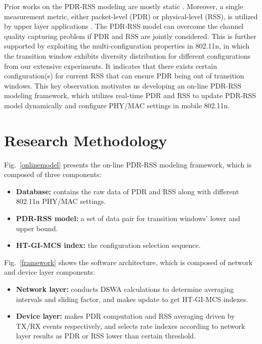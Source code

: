 \documentclass[draftclsnofoot,journal,onecolumn,11pt]{IEEEtran}
\begin{document}
Prior works on the PDR-RSS modeling are mostly static \cite{kashyap2007capacity} \cite{kolar2011mesh} \cite{reis2006model}. Moreover, a single measurement metric, either packet-level (PDR) or physical-level (RSS), is utilized by upper layer applications\cite{judd2008efficient} \cite{zhang2008practical}. The PDR-RSS model can overcome the channel quality capturing problem if PDR and RSS are jointly considered. This is further supported by exploiting the multi-configuration properties in 802.11n, in which the transition window exhibits diversity distribution for different configurations from our extensive experiments. It indicates that there exists certain configuration(s) for current RSS that can ensure PDR being out of transition windows. This key observation motivates us developing an on-line PDR-RSS modeling framework, which utilizes real-time PDR and RSS to update PDR-RSS model dynamically and configure PHY/MAC settings in mobile 802.11n.

\section{Research Methodology}

Fig.~\ref{onlinemodel} presents the on-line PDR-RSS modeling framework, which is composed of three components:
\begin{itemize}
  \item \textbf{Database:} contains the raw data of PDR and RSS along with different 802.11n PHY/MAC settings.
  \item \textbf{PDR-RSS model:} a set of data pair for transition windows' lower and upper bound.
  \item \textbf{HT-GI-MCS index:} the configuration selection sequence.
\end{itemize}

Fig.~\ref{framework} shows the software architecture, which is composed of network and device layer components:
\begin{itemize}
  \item \textbf{Network layer:} conducts DSWA calculations to determine averaging intervals and sliding factor, and makes update to get HT-GI-MCS indexes.
  \item \textbf{Device layer:} makes PDR computation and RSS averaging driven by TX/RX events respectively, and selects rate indexes according to network layer results as PDR or RSS lower than certain threshold.
\end{itemize}
\end{document}
